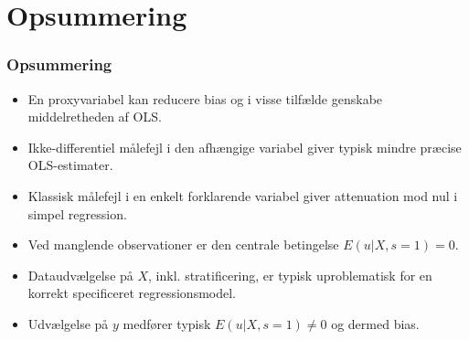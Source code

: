 \documentclass[aspectratio=43,t]{beamer}
\begin{document}


\section*{Opsummering}


\begin{frame}
\frametitle{Opsummering}

\begin{itemize}
\item En proxyvariabel kan reducere bias og i visse tilfælde genskabe middelretheden af OLS.
\medskip
\item Ikke-differentiel målefejl i den afhængige variabel giver typisk mindre præcise OLS-estimater.
\medskip
\item Klassisk målefejl i en enkelt forklarende variabel giver attenuation mod nul i simpel regression.
\medskip
\item Ved manglende observationer er den centrale betingelse $E(u|X,s=1)=0$.
\medskip
\item Dataudvælgelse på $X$, inkl. stratificering, er typisk uproblematisk for en korrekt specificeret regressionsmodel.
\medskip
\item Udvælgelse på $y$ medfører typisk $E(u|X,s=1)\neq0$ og dermed bias.

\end{itemize}

\end{frame}

\end{document}
